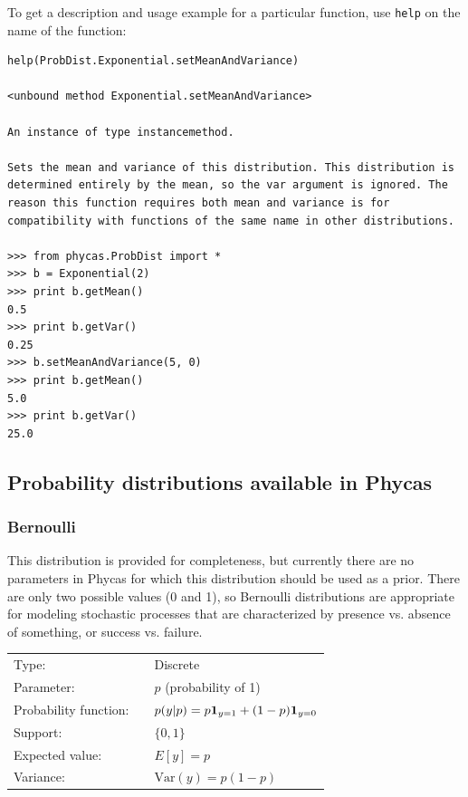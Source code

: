 \documentclass[10pt]{article}
\newcommand{\code}[1]{{\tt #1}}					%
\newcommand{\one}[1]{\mbox{${\bf 1}_{#1}$}}
\newcommand{\Var}{\mbox{Var}}
\begin{document}
%
To get a description and usage example for a particular function, use \code{help} on the name of the function:
%
\begin{verbatim}
help(ProbDist.Exponential.setMeanAndVariance)

<unbound method Exponential.setMeanAndVariance>

An instance of type instancemethod.

Sets the mean and variance of this distribution. This distribution is
determined entirely by the mean, so the var argument is ignored. The
reason this function requires both mean and variance is for
compatibility with functions of the same name in other distributions.

>>> from phycas.ProbDist import *
>>> b = Exponential(2)
>>> print b.getMean()
0.5
>>> print b.getVar()
0.25
>>> b.setMeanAndVariance(5, 0)
>>> print b.getMean()
5.0
>>> print b.getVar()
25.0
\end{verbatim}

\subsection{Probability distributions available in Phycas}\label{availabledistributions}

\subsubsection{Bernoulli}\label{bernoullidist}

\renewcommand{\arraystretch}{1.5}

This distribution is provided for completeness, but currently there are no parameters in Phycas for which this distribution should be used as a prior. There are only two possible values (0 and 1), so Bernoulli distributions are appropriate for modeling stochastic processes that are characterized by presence vs. absence of something, or success vs. failure.

\begin{tabular}{lcl}
Type:                 & & Discrete \\
Parameter:            & & $p$ (probability of 1) \\
Probability function: & & $p(y|p) = p \one{y=1} + (1-p) \one{y=0}$ \\
Support:              & & $\{0,1\}$  \\
Expected value:       & & $E[y] = p$ \\
Variance:             & & $\Var(y) = p(1-p)$ 
\end{tabular}
\end{document}
